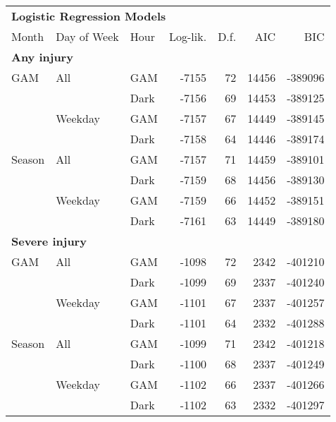 \begin{tabular}{lllrrrr}
\toprule
\multicolumn{7}{l}{\normalsize\textbf{Logistic Regression Models}}\\\addlinespace
Month  &  Day of Week  &  Hour  &  Log-lik.  &  D.f.  &     AIC  &       BIC \\
\midrule
\multicolumn{7}{l}{\textbf{Any injury}}\\\addlinespace
GAM & All & GAM &  -7155 &       72 &  14456 &  -389096 \\
       &        & Dark &  -7156 &       69 &  14453 &  -389125 \\\addlinespace
       & Weekday & GAM &  -7157 &       67 &  14449 &  -389145 \\
       &        & Dark &  -7158 &       64 &  14446 &  -389174 \\\addlinespace
Season & All & GAM &  -7157 &       71 &  14459 &  -389101 \\
       &        & Dark &  -7159 &       68 &  14456 &  -389130 \\\addlinespace
       & Weekday & GAM &  -7159 &       66 &  14452 &  -389151 \\
       &        & Dark &  -7161 &       63 &  14449 &  -389180 \\
\midrule
\multicolumn{7}{l}{\textbf{Severe injury}}\\\addlinespace
GAM & All & GAM &  -1098 &       72 &  2342 &  -401210 \\
       &        & Dark &  -1099 &       69 &  2337 &  -401240 \\\addlinespace
       & Weekday & GAM &  -1101 &       67 &  2337 &  -401257 \\
       &        & Dark &  -1101 &       64 &  2332 &  -401288 \\\addlinespace
Season & All & GAM &  -1099 &       71 &  2342 &  -401218 \\
       &        & Dark &  -1100 &       68 &  2337 &  -401249 \\\addlinespace
       & Weekday & GAM &  -1102 &       66 &  2337 &  -401266 \\
       &        & Dark &  -1102 &       63 &  2332 &  -401297 \\
\bottomrule
\end{tabular}